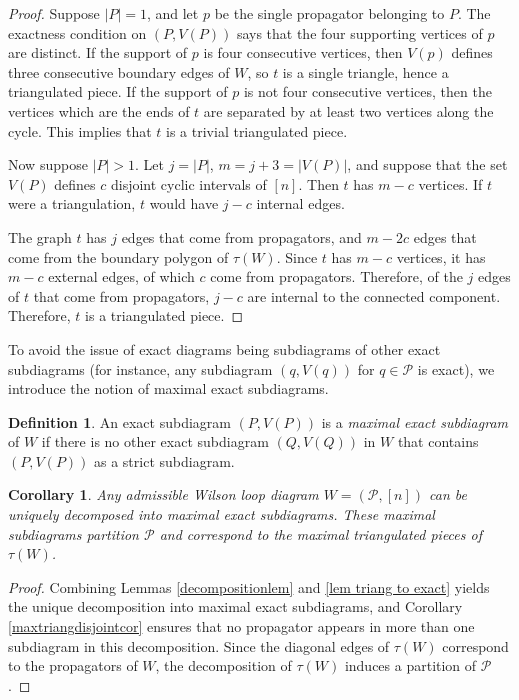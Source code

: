 \documentclass[11pt]{article}
\newcommand{\cP}{\mathcal{P}}
\newtheorem{cor}[thm]{Corollary}
\theoremstyle{remark}
\theoremstyle{definition}
\newtheorem{dfn}[thm]{Definition}
\begin{document}
\begin{proof}
Suppose $|P|=1$, and let $p$ be the single propagator belonging to $P$. The exactness condition on $(P, V(P))$ says that the four supporting vertices of $p$ are distinct.  If the support of $p$ is four consecutive vertices, then $V(p)$ defines three consecutive boundary edges of $W$, so $t$ is a single triangle, hence a triangulated piece.  If the support of $p$ is not four consecutive vertices, then the vertices which are the ends of $t$ are separated by at least two vertices along the cycle.  This implies that $t$ is a trivial triangulated piece.

Now suppose $|P|>1$.  Let $j=|P|$, $m= j+3=|V(P)|$, and 
suppose that the set $V(P)$ defines $c$ disjoint cyclic intervals of $[n]$. Then $t$ has $m-c$ vertices.  If $t$ were a triangulation, $t$ would have $j -c$ internal edges.

The graph $t$ has $j$ edges that come from propagators, and $m - 2c$ edges that come from the boundary polygon of $\tau(W)$. Since $t$ has $m-c$ vertices, it has $m-c$ external edges, of which $c$ come from propagators. Therefore, of the $j$ edges of $t$ that come from propagators, $j-c$ are internal to the connected component. Therefore, $t$ is a triangulated piece.


\end{proof}





To avoid the issue of exact diagrams being subdiagrams of other exact subdiagrams (for instance, any subdiagram $(q, V(q))$ for $q \in \cP$ is exact), we introduce the notion of maximal exact subdiagrams.

\begin{dfn}
An exact subdiagram $(P, V(P))$ is a {\em maximal exact subdiagram} of $W$ if there is no other exact subdiagram $(Q, V(Q))$ in $W$ that contains $(P,V(P))$ as a strict subdiagram.
\end{dfn}

\begin{cor} \label{uniqueproppartitioncor}
Any admissible Wilson loop diagram $W = (\cP, [n])$ can be uniquely decomposed into maximal exact subdiagrams. These maximal subdiagrams partition $\cP$ and correspond to the maximal triangulated pieces of $\tau(W)$.
\end{cor}

\begin{proof}
Combining Lemmas \ref{decompositionlem} and \ref{lem triang to exact} yields the unique decomposition into maximal exact subdiagrams, and Corollary \ref{maxtriangdisjointcor} ensures that no propagator appears in more than one subdiagram in this decomposition. Since the diagonal edges of $\tau(W)$ correspond to the propagators of $W$, the decomposition of $\tau(W)$ induces a partition of $\cP$.
\end{proof}
\end{document}
